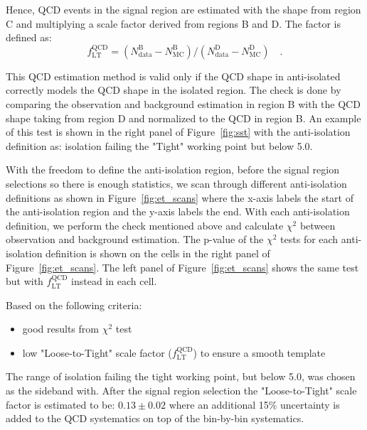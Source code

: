 Hence, QCD events in the signal region are estimated with the shape from region C 
and multiplying a scale factor derived from regions B and D. The factor is defined as:
\begin{equation}\label{eq:et_qcd_sf}
f_\mathrm{LT}^\mathrm{QCD} = \left(N_\mathrm{data}^\mathrm{B} - N_\mathrm{MC}^\mathrm{B}\right)
/ \left(N_\mathrm{data}^\mathrm{D} -
N_\mathrm{MC}^\mathrm{D}\right)\quad.
\end{equation}

This QCD estimation method is valid only if the QCD shape in anti-isolated 
correctly models the QCD shape in the isolated region. The check is done 
by comparing the observation and background estimation in region B with 
the QCD shape taking from region D and normalized to the QCD in region B. 
An example of this test is shown in the right panel of Figure~\ref{fig:sst} 
with the anti-isolation definition as: \tauh isolation failing the "Tight" 
working point but below 5.0\gev. 

With the freedom to define the \tauh anti-isolation region, before the 
signal region selections so there is enough statistics, we scan 
through different anti-isolation definitions as shown in Figure~\ref{fig:et_scans} 
where the x-axis labels the start of the anti-isolation region and the 
y-axis labels the end. With each anti-isolation definition, we perform 
the check mentioned above and calculate $\chi^2$ between observation 
and background estimation. The p-value of the $\chi^2$ tests for each 
anti-isolation definition is shown on the cells in the right panel 
of Figure~\ref{fig:et_scans}. The left panel of Figure~\ref{fig:et_scans} shows 
the same test but with $f_\mathrm{LT}^\mathrm{QCD}$ instead in each cell.

Based on the following criteria:
\begin{itemize}
  \item good results from $\chi^2$ test
  \item low "Loose-to-Tight" scale factor ($f_\mathrm{LT}^\mathrm{QCD}$) to ensure a smooth template
\end{itemize}

The range of isolation failing the tight working point, but below 5.0\gev, was chosen as the
sideband with. After the signal region selection the "Loose-to-Tight" scale factor is estimated
to be: $0.13 \pm 0.02$ where an additional 15\% uncertainty is added to the QCD systematics 
on top of the bin-by-bin systematics.


